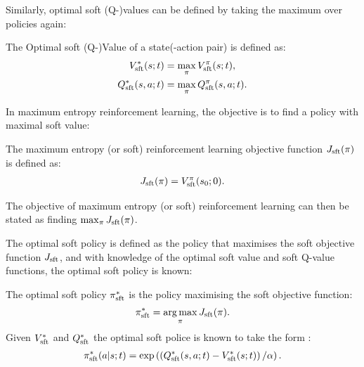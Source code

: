         Similarly, optimal soft (Q-)values can be defined by taking the maximum over policies again:
        \begin{defn}
            \label{def:optimal_sft_value}
            \label{def:optimal_sft_q_value}
            The \textnormal{Optimal soft (Q-)Value} of a state(-action pair) is defined as:
            \begin{align}
                V_{{\textnormal{sft}}}^*(s;t) &= \max_{\pi} V_{{\textnormal{sft}}}^{\pi}(s;t), \label{eq:opt_soft_value_fn_def} \\
                Q_{{\textnormal{sft}}}^*(s,a;t) &= \max_{\pi} Q_{{\textnormal{sft}}}^{\pi}(s,a;t). \label{eq:opt_soft_q_value_fn_def}
            \end{align}
        \end{defn}

        In maximum entropy reinforcement learning, the objective is to find a policy with maximal soft value:
        \begin{defn}
            \label{def:soft_rl_obj_fn}
            The \textnormal{maximum entropy (or soft) reinforcement learning objective function} $J_{{\textnormal{sft}}}(\pi)$ is defined as:
            \begin{align}
                J_{{\textnormal{sft}}}(\pi) = V_{{\textnormal{sft}}}^{\pi}(s_0;0). \label{eq:soft_rl_obj_fn_def}
            \end{align}

            The objective of maximum entropy (or soft) reinforcement learning can then be stated as finding $\max_{\pi} J_{{\textnormal{sft}}}(\pi)$.
        \end{defn}

        The optimal soft policy is defined as the policy that maximises the soft objective function $J_{{\textnormal{sft}}}$, and with knowledge of the optimal soft value and soft Q-value functions, the optimal soft policy is known:
        \begin{defn}
            \label{def:opt_sft_policy}
            The \textnormal{optimal soft policy} $\pi_{{\textnormal{sft}}}^*$ is the policy maximising the soft objective function:
            \begin{align}
                \pi_{{\textnormal{sft}}}^* = \operatorname*{arg\,max}_\pi J_{{\textnormal{sft}}}(\pi). \label{eq:opt_sft_policy_def}
            \end{align}
            Given $V_{{\textnormal{sft}}}^*$ and $Q_{{\textnormal{sft}}}^*$ the optimal soft police is known to take the form :
            \begin{align}
                \pi_{{\textnormal{sft}}}^*(a|s;t) = \exp\left(\left(Q_{{\textnormal{sft}}}^*(s,a;t) - V_{{\textnormal{sft}}}^*(s;t)\right) / \alpha \right). \label{eq:opt_sft_policy_from_opt_value_fns}
            \end{align}
        \end{defn}

